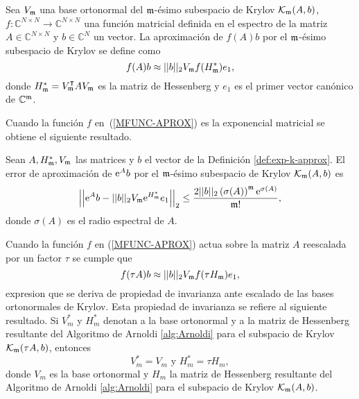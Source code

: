 \begin{definition}\label{def:exp-k-approx}
    \cite{Saad92} Sea $V_{\mathfrak{m}}$ una base ortonormal del $\mathfrak{m}$-ésimo subespacio de Krylov $\mathcal{K}_{\mathfrak{m}}(A,b)$, $f: \mathbb{C}^{N\times N} \to \mathbb{C}^{N\times N}$ una función matricial definida
    en el espectro de la matriz $A\in\mathbb{C}^{N\times N}$ y $b\in\mathbb{C}^{N}$ un vector. La aproximación de $f(A)b$ por el  $\mathfrak{m}$-ésimo subespacio de Krylov se define como
    \begin{equation}
        f(A)b\approx ||b||_2 V_{\mathfrak{m}} f(H^*_{\mathfrak{m}})e_1, \label{MFUNC-APROX}
    \end{equation}
    donde $H_{\mathfrak{m}}^*=V_{\mathfrak{m}}^{\intercal}AV_{\mathfrak{m}}$ es la matriz de Hessenberg y $e_1$ es el primer vector canónico de $\mathbb{C}^{\mathfrak{m}}$.
\end{definition}
Cuando la función $f$ en~(\ref{MFUNC-APROX}) es la exponencial matricial se obtiene el siguiente resultado.
\begin{theorem}\label{exp-bound}
	\cite{Saad92} Sean $A,H^*_{\mathfrak{m}},V_{\mathfrak{m}}$ las matrices y $b$ el vector de la Definición \ref{def:exp-k-approx}. El error de aproximación de $\mathrm{e}^{A}b$ por el $\mathfrak{m}$-ésimo subespacio de Krylov $\mathcal{K}_{\mathfrak{m}}(A,b)$ es
	\begin{equation*}
	\left\lvert\left\lvert \mathrm{e}^{A}b - \lvert\lvert b \rvert\rvert_2 V_{\mathfrak{m}}\mathrm{e}^{H^*_{\mathfrak{m}}}e_1 \right\rvert\right\rvert_2 
	\leq \frac{2\vert\lvert b \rvert\rvert_2 \left( \sigma(A) \right)^{\mathfrak{m}}\mathrm{e}^{\sigma(A)}}{\mathfrak{m}!},
	\end{equation*}
	donde $\sigma(A)$ es el radio espectral de $A$.
\end{theorem}

Cuando la función $f$ en (\ref{MFUNC-APROX}) actua sobre la matriz $A$ reescalada por un factor $\tau$ se cumple que \cite{Saad92}
\begin{equation*}
	f(\tau A)b\approx ||b||_2 V_{\mathfrak{m}} f(\tau H_{\mathfrak{m}})e_1,
\end{equation*}
expresion que se deriva de propiedad de invarianza ante escalado de las bases ortonormales de Krylov. Esta propiedad de invarianza se refiere al siguiente resultado. Si $V^*_m$ y $H^*_m$ denotan a la base ortonormal y a la matriz de Hessenberg resultante del Algoritmo de Arnoldi \ref{alg:Arnoldi} para el subspacio de Krylov $\mathcal{K}_{\mathfrak{m}}(\tau A,b)$, entonces
\[ V^*_m=V_m       \text{   y    }      H^*_m=\tau H_m,\]
donde $V_m$ es la base ortonormal y $H_m$  la matriz de Hessenberg resultante del Algoritmo de Arnoldi \ref{alg:Arnoldi} para el subspacio de Krylov $\mathcal{K}_{\mathfrak{m}}(A,b)$.

